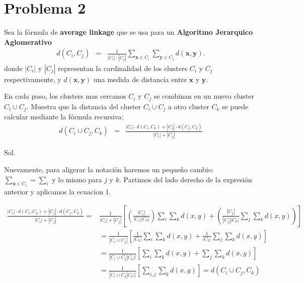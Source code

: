 \documentclass[letter, 11pt, twoside]{report}
\begin{document}

{\color{mirosa}\section*{Problema 2}}


   Sea la f\'ormula  de \textbf{average linkage} que se usa para un \textbf{Algoritmo Jerarquico Aglomerativo}
   \begin{eqnarray}
   d(C_i, C_j) &=&  {\displaystyle {\frac {1}{|C_i|\cdot |C_j|}}\sum _{\textbf{x}\in C_i}\sum _{\textbf{y}\in C_j}d(\textbf{x},\textbf{y}).}
   \end{eqnarray}
   donde $|C_i|$ y  $|C_j|$ representan la cardinalidad de los clusters $C_i$ y $C_j$ respectivamente, y $d(\textbf{x},\textbf{y})$ una medida de distancia entre $\textbf{x}$ y $\textbf{y}$. 
   
   En cada paso, los clusters mas cercanos $C_i$ y $C_j$ se combinan   en un nuevo cluster $C_i\cup C_j$.
   Muestra que la distancia del  cluster $C_i\cup C_j$ a otro cluster $C_k$ se puede calcular mediante la f\'ormula recursiva:
   \begin{eqnarray*}
   d(C_i\cup C_j,C_k) &=&{\frac {|C_i|\cdot d({C_i},C_k)+|{C_j}|\cdot d(C_j,C_k)}{|{C_i}|+|C_j|}}
   \end{eqnarray*}

   {\color{mirosa}Sol.}

   Nuevamente, para aligerar la notación haremos un pequeño cambio: $\sum_{\textbf{x}\in C_i}=\sum_{i}$ y lo
   mismo para $j$ y $k$. Partimos del lado derecho de la expresión anterior y aplicamos la ecuacion 1.

\begin{align*}
    \frac {|C_i|\cdot d({C_i},C_k)+|{C_j}|\cdot d(C_j,C_k)}{|{C_i}|+|C_j|}=&\frac{1}{|C_i|+|C_j|}\left[\left(\frac{|C_i|}{|C_i||C_k|}\right)\sum_{i} \sum_{k} d(x, y)+ \left(\frac{|C_j|}{|C_j||C_k|}\sum_{j} \sum_{k} d(x, y)\right)\right]\\
    &=\frac{1}{|C_i\cup C_j|}\left[\frac{1}{|C_k|}\sum_{i} \sum_{k} d(x, y)+ \frac{1}{|C_k|}\sum_{j} \sum_{k} d(x, y)\right]\\
    &=\frac{1}{|C_i\cup C_j|C_k||}\left[\sum_{i} \sum_{k} d(x, y)+ \sum_{j} \sum_{k} d(x, y)\right]\\
    &=\frac{1}{|C_i\cup C_j|C_k||}\left[\sum_{i,j} \sum_{k} d(x, y)\right]=d(C_i\cup C_j,C_k)
\end{align*}
 

\end{document}
